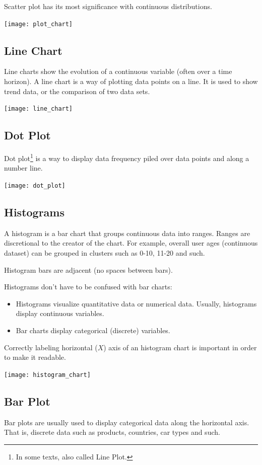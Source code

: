 \documentclass{article}
\begin{document}
Scatter plot has its most significance with continuous distributions. 

\texttt{[image: plot\_chart]}

\subsection{Line Chart}
Line charts show the evolution of a continuous variable (often over a time horizon).
A line chart is a way of plotting data points on a line. 
It is used to show trend data, or the comparison of two data sets.

\texttt{[image: line\_chart]}

\subsection{Dot Plot}
Dot plot\footnote{In some texts, also called Line Plot.} is a way to display data frequency piled over data points and along a number line. 

\texttt{[image: dot\_plot]}

\subsection{Histograms}
A histogram is a bar chart that groups continuous data into ranges. Ranges are discretional to the creator of the chart. For example, overall user ages (continuous dataset) can be grouped in clusters such as 0-10, 11-20 and such.

Histogram bars are adjacent (no spaces between bars).

Histograms don’t have to be confused with bar charts:
\begin{itemize}
    \item Histograms visualize quantitative data or numerical data. Usually, histograms display continuous variables. 
    \item Bar charts display categorical (discrete) variables. 
\end{itemize}

Correctly labeling horizontal ($X$) axis of an histogram chart is important in order to make it readable.

\texttt{[image: histogram\_chart]}

\subsection{Bar Plot}
Bar plots are usually used to display categorical data along the horizontal axis. That is, discrete data such as products, countries, car types and such. 
\end{document}
